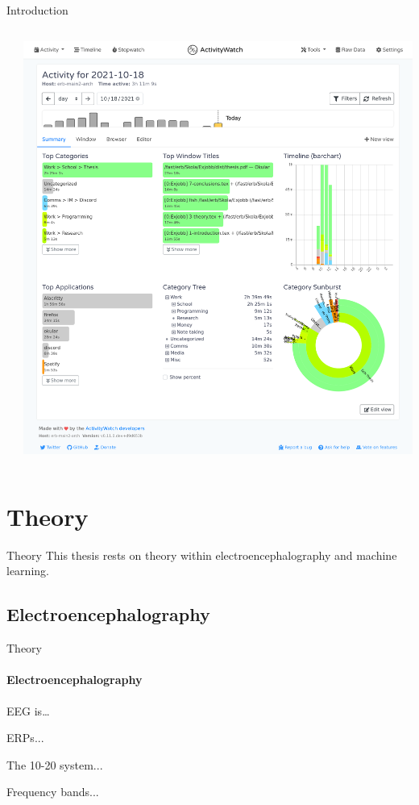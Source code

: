 \documentclass[xcolor={dvipsnames,table}]{beamer}
\newif\ifplacelogo{}  %
\begin{document}
\begin{frame}{Introduction}
\begin{columns}
\begin{column}{0.5\textwidth}
            \vspace{10em}
        \end{column}
        \begin{column}{0.65\textwidth}
            \includegraphics[width=\textwidth]{img/screenshot-aw-activity.png}
        \end{column}
    \end{columns}
\end{frame}
\placelogotrue{}

\section{Theory}
\begin{frame}{Theory}
    This thesis rests on theory within electroencephalography and machine learning.
\end{frame}

\subsection{Electroencephalography}
\begin{frame}{Theory}
    \framesubtitle{Electroencephalography}

    EEG is\ldots

    ERPs...

    The 10-20 system...

    Frequency bands...
\end{frame}
\end{document}
